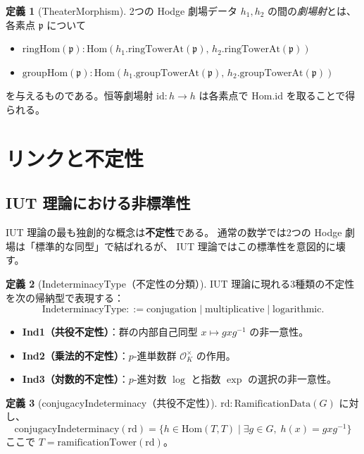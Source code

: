\documentclass[a4paper,11pt]{ltjsarticle}
\theoremstyle{definition}
\newtheorem{definition}{定義}[section]
\theoremstyle{plain}
\theoremstyle{remark}
\newcommand{\Hom}{\mathrm{Hom}}
\newcommand{\id}{\mathrm{id}}
\begin{document}
\begin{definition}[TheaterMorphism]
2つの Hodge 劇場データ $h_1, h_2$ の間の\emph{劇場射}とは、
各素点 $\mathfrak{p}$ について
\begin{itemize}
  \item $\mathrm{ringHom}(\mathfrak{p}) : \Hom(h_1.\mathrm{ringTowerAt}(\mathfrak{p}),\, h_2.\mathrm{ringTowerAt}(\mathfrak{p}))$
  \item $\mathrm{groupHom}(\mathfrak{p}) : \Hom(h_1.\mathrm{groupTowerAt}(\mathfrak{p}),\, h_2.\mathrm{groupTowerAt}(\mathfrak{p}))$
\end{itemize}
を与えるものである。恒等劇場射 $\id : h \to h$ は各素点で $\Hom.\id$ を取ることで得られる。
\end{definition}

\section{リンクと不定性}
\label{sec:links}

\subsection{IUT 理論における非標準性}

IUT 理論の最も独創的な概念は\textbf{不定性}である。
通常の数学では2つの Hodge 劇場は「標準的な同型」で結ばれるが、
IUT 理論ではこの標準性を意図的に壊す。

\begin{definition}[IndeterminacyType（不定性の分類）]
IUT 理論に現れる3種類の不定性を次の帰納型で表現する：
\[
  \mathrm{IndeterminacyType} ::= \mathrm{conjugation} \mid \mathrm{multiplicative} \mid \mathrm{logarithmic}.
\]
\begin{itemize}
  \item \textbf{Ind1（共役不定性）}：群の内部自己同型 $x \mapsto gxg^{-1}$ の非一意性。
  \item \textbf{Ind2（乗法的不定性）}：$p$-進単数群 $\mathcal{O}_K^{\times}$ の作用。
  \item \textbf{Ind3（対数的不定性）}：$p$-進対数 $\log$ と指数 $\exp$ の選択の非一意性。
\end{itemize}
\end{definition}

\begin{definition}[conjugacyIndeterminacy（共役不定性）]
$\mathrm{rd} : \mathrm{RamificationData}(G)$ に対し、
\[
  \mathrm{conjugacyIndeterminacy}(\mathrm{rd}) =
  \{ h \in \Hom(T, T) \mid \exists g \in G,\; h(x) = gxg^{-1} \}
\]
ここで $T = \mathrm{ramificationTower}(\mathrm{rd})$。
\end{definition}
\end{document}
